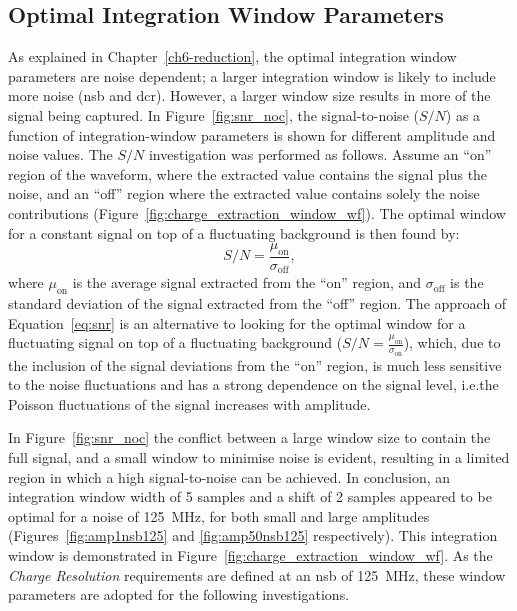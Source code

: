 \subsection{Optimal Integration Window Parameters}

As explained in Chapter~\ref{ch6-reduction}, the optimal integration window parameters are noise dependent; a larger integration window is likely to include more noise (\gls{nsb} and \gls{dcr}). However, a larger window size results in more of the signal being captured. In Figure~\ref{fig:snr_noc}, the signal-to-noise ($S/N$) as a function of integration-window parameters is shown for different amplitude and noise values. The $S/N$ investigation was performed as follows. Assume an ``on'' region of the waveform, where the extracted value contains the signal plus the noise, and an ``off'' region where the extracted value contains solely the noise contributions (Figure~\ref{fig:charge_extraction_window_wf}). The optimal window for a constant signal on top of a fluctuating background is then found by:
\begin{equation} \label{eq:snr}
S/N = \frac{\mu_\text{on}}{\sigma_\text{off}},
\end{equation}
where $\mu_\text{on}$ is the average signal extracted from the ``on'' region, and $\sigma_\text{off}$ is the standard deviation of the signal extracted from the ``off'' region. The approach of Equation~\ref{eq:snr} is an alternative to looking for the optimal window for a fluctuating signal on top of a fluctuating background ($S/N = \frac{\mu_\text{on}}{\sigma_\text{on}}$), which, due to the inclusion of the signal deviations from the ``on'' region, is much less sensitive to the noise fluctuations and has a strong dependence on the signal level, i.e.\@ the Poisson fluctuations of the signal increases with amplitude.

In Figure~\ref{fig:snr_noc} the conflict between a large window size to contain the full signal, and a small window to minimise noise is evident, resulting in a limited region in which a high signal-to-noise can be achieved. In conclusion, an integration window width of 5 samples and a shift of 2 samples appeared to be optimal for a noise of \SI{125}{MHz}, for both small and large amplitudes (Figures~\ref{fig:amp1nsb125} and \ref{fig:amp50nsb125} respectively). This integration window is demonstrated in Figure~\ref{fig:charge_extraction_window_wf}. As the \textit{Charge Resolution} requirements are defined at an \gls{nsb} of \SI{125}{MHz}, these window parameters are adopted for the following investigations.

